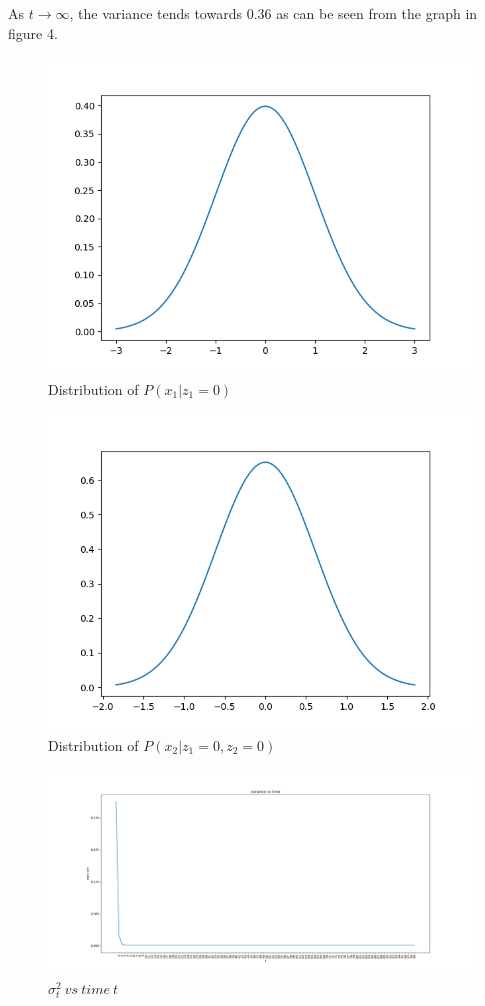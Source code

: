 \documentclass[letter, 9pt]{article}
\begin{document}
As $t\rightarrow\infty$, the variance tends towards 0.36 as can be seen from the graph in figure 4.
\begin{figure}[H]
    \centering
        \includegraphics[width=\textwidth, height=0.4\textwidth]{HW3/t1.png}
    \caption{Distribution of $P(x_1|z_1=0)$}
\end{figure}

\begin{figure}[H]
    \centering
        \includegraphics[width=\textwidth, height=0.4\textwidth]{HW3/t=2.png}
    \caption{Distribution of $P(x_2|z_1=0, z_2=0)$}
\end{figure}

\begin{figure}[H]
    \centering
        \includegraphics[width=\textwidth, height=0.4\textwidth]{HW3/variance_time.png}
    \caption{$\sigma_t^2\ vs\ time\ t$}
\end{figure}
\end{document}
